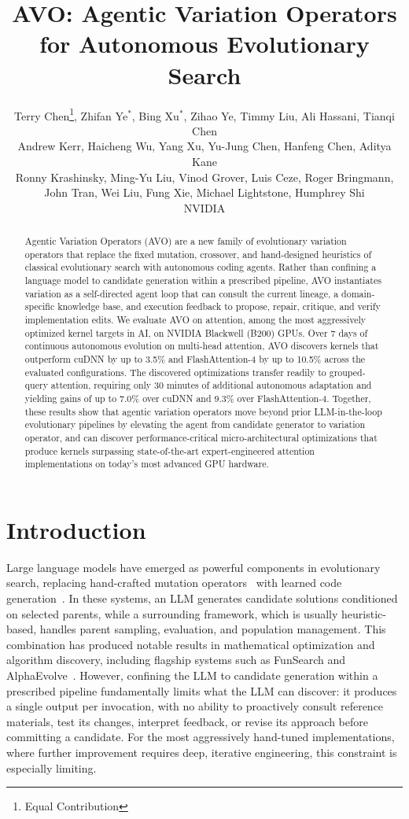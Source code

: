 \documentclass{article}
\title{AVO: Agentic Variation Operators for
Autonomous Evolutionary Search}
\author{%
  Terry Chen\thanks{Equal Contribution}, Zhifan Ye$^*$, Bing Xu$^*$, Zihao Ye, Timmy Liu,  Ali Hassani, Tianqi Chen

Andrew Kerr, Haicheng Wu, Yang Xu, Yu-Jung Chen, Hanfeng Chen, Aditya Kane

  Ronny Krashinsky, Ming-Yu Liu, Vinod Grover, Luis Ceze, Roger Bringmann,

  John Tran, Wei Liu, Fung Xie, Michael Lightstone, Humphrey Shi


  NVIDIA

















}
\begin{document}
\maketitle

\begin{abstract}
Agentic Variation Operators (AVO) are a new family of evolutionary variation operators that replace the fixed mutation, crossover, and hand-designed heuristics of classical evolutionary search with autonomous coding agents.
Rather than confining a language model to candidate generation within a prescribed pipeline, AVO instantiates variation as a self-directed agent loop that can consult the current lineage, a domain-specific knowledge base, and execution feedback to propose, repair, critique, and verify implementation edits.
We evaluate AVO on attention, among the most aggressively optimized kernel targets in AI, on NVIDIA Blackwell (B200) GPUs. Over 7 days of continuous autonomous evolution on multi-head attention, AVO discovers kernels that outperform cuDNN by up to 3.5\% and FlashAttention-4 by up to 10.5\% across the evaluated configurations. The discovered optimizations transfer readily to grouped-query attention, requiring only 30 minutes of additional autonomous adaptation and yielding gains of up to 7.0\% over cuDNN and 9.3\% over FlashAttention-4.
Together, these results show that agentic variation operators move beyond prior LLM-in-the-loop evolutionary pipelines by elevating the agent from candidate generator to variation operator, and can discover performance-critical micro-architectural optimizations that produce kernels surpassing state-of-the-art expert-engineered attention implementations on today’s most advanced GPU hardware.
\end{abstract}

\section{Introduction}
\label{sec:introduction}

Large language models have emerged as powerful components in evolutionary search, replacing hand-crafted mutation operators~\citep{o2010open} with learned code generation~\citep{lehman2022elm, funsearch2024, alphaevolve2025, chen2023evoprompting}.
In these systems, an LLM generates candidate solutions conditioned on selected parents, while a surrounding framework, which is usually heuristic-based, handles parent sampling, evaluation, and population management.
This combination has produced notable results in mathematical optimization and algorithm discovery, including flagship systems such as FunSearch and AlphaEvolve~\citep{funsearch2024, alphaevolve2025}.
However, confining the LLM to candidate generation within a prescribed pipeline fundamentally limits what the LLM can discover: it produces a single output per invocation, with no ability to proactively consult reference materials, test its changes, interpret feedback, or revise its approach before committing a candidate.
For the most aggressively hand-tuned implementations, where further improvement requires deep, iterative engineering, this constraint is especially limiting.
\end{document}
